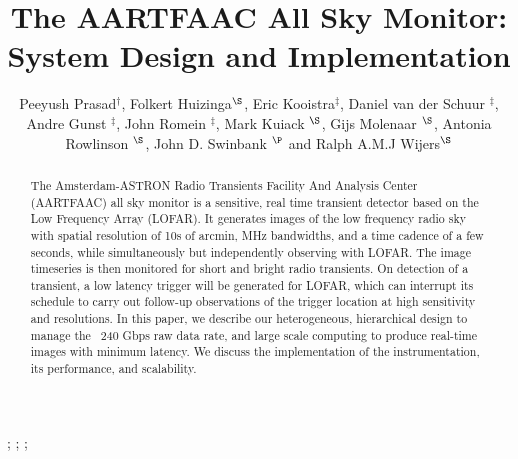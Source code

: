 \documentclass{ws-jai}
\begin{document}
\catchline{}{}{}{}{} %


\title{The AARTFAAC All Sky Monitor: System Design and Implementation}

\author{Peeyush      Prasad$^\dagger$,      Folkert     Huizinga$^\S$,      Eric
  Kooistra$^\ddagger$,   Daniel  van   der  Schuur   $^\ddagger$,  Andre   Gunst
  $^\ddagger$, John Romein $^\ddagger$, Mark  Kuiack $^\S$, Gijs Molenaar $^\S$,
  Antonia Rowlinson $^\S$, John D. Swinbank $^\P$ and Ralph A.M.J Wijers$^\S$}

\address{ $^\dagger$Anton Pannekoek Institute,  University of Amsterdam, Postbus
  94249        1090        GE,         Amsterdam,        The        Netherlands,
  p.prasad@uva.nl\\   $^\ddagger$ASTRON,  Oude   Hoogeveensedijk,  7991PD,   The
  Netherlands\\ $^\S$Anton Pannekoek Institute, University of Amsterdam, Postbus
  94249 1090  GE, Amsterdam, The Netherlands\\  $^\P$Department of Astrophysical
  Sciences, Princeton University, Princeton, NJ 08544, USA\\ }

\maketitle


\begin{history}
;
;
;
\end{history}

\begin{abstract}
The Amsterdam-ASTRON  Radio Transients  Facility And Analysis  Center (AARTFAAC)
all sky monitor  is a sensitive, real  time transient detector based  on the Low
Frequency Array  (LOFAR).  It generates  images of  the low frequency  radio sky
with spatial resolution of 10s of arcmin,  MHz bandwidths, and a time cadence of
a few seconds, while simultaneously but independently observing with LOFAR.  The
image timeseries  is then monitored  for short  and bright radio  transients. On
detection of  a transient, a  low latency trigger  will be generated  for LOFAR,
which can  interrupt its  schedule to  carry out  follow-up observations  of the
trigger  location  at high  sensitivity  and  resolutions.   In this  paper,  we
describe our heterogeneous, hierarchical design to manage the ~240 Gbps raw data
rate,  and  large scale  computing  to  produce  real-time images  with  minimum
latency.  We discuss the implementation of the instrumentation, its performance,
and scalability.
\end{abstract}
\end{document}
